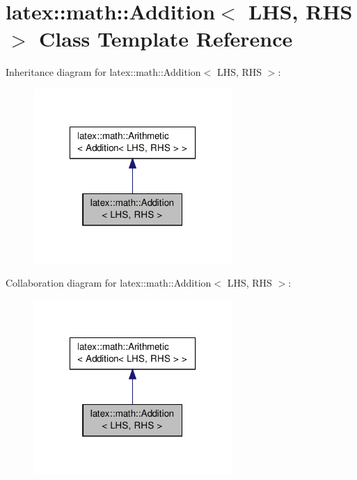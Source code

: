 \hypertarget{classlatex_1_1math_1_1Addition}{\section{latex\-:\-:math\-:\-:Addition$<$ L\-H\-S, R\-H\-S $>$ Class Template Reference}
\label{classlatex_1_1math_1_1Addition}
}


Inheritance diagram for latex\-:\-:math\-:\-:Addition$<$ L\-H\-S, R\-H\-S $>$\-:
\nopagebreak
\begin{figure}[H]
\begin{center}
\leavevmode
\includegraphics[width=214pt]{classlatex_1_1math_1_1Addition__inherit__graph}
\end{center}
\end{figure}


Collaboration diagram for latex\-:\-:math\-:\-:Addition$<$ L\-H\-S, R\-H\-S $>$\-:
\nopagebreak
\begin{figure}[H]
\begin{center}
\leavevmode
\includegraphics[width=214pt]{classlatex_1_1math_1_1Addition__coll__graph}
\end{center}
\end{figure}
